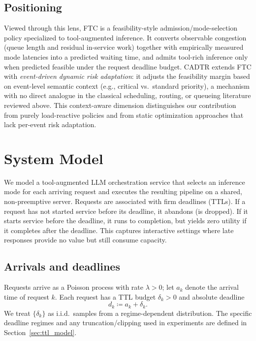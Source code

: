 \documentclass[preprint,12pt]{elsarticle}
\begin{document}
\subsection{Positioning}
Viewed through this lens, FTC is a feasibility-style admission/mode-selection policy specialized to tool-augmented inference. It converts observable congestion (queue length and residual in-service work) together with empirically measured mode latencies into a predicted waiting time, and admits tool-rich inference only when predicted feasible under the request deadline budget. CADTR extends FTC with \emph{event-driven dynamic risk adaptation}: it adjusts the feasibility margin based on event-level semantic context (e.g., critical vs.\ standard priority), a mechanism with no direct analogue in the classical scheduling, routing, or queueing literature reviewed above. This context-aware dimension distinguishes our contribution from purely load-reactive policies and from static optimization approaches that lack per-event risk adaptation.

\section{System Model}
\label{sec:model}

We model a tool-augmented LLM orchestration service that selects an inference mode for each arriving request and executes the resulting pipeline on a shared, non-preemptive server. Requests are associated with firm deadlines (TTLs). If a request has not started service before its deadline, it abandons (is dropped). If it starts service before the deadline, it runs to completion, but yields zero utility if it completes after the deadline. This captures interactive settings where late responses provide no value but still consume capacity.

\subsection{Arrivals and deadlines}
\label{sec:arrivals_deadlines}

Requests arrive as a Poisson process with rate $\lambda>0$; let $a_k$ denote the arrival time of request $k$. Each request has a TTL budget $\delta_k>0$ and absolute deadline
\begin{equation}
d_k \coloneqq a_k + \delta_k.
\end{equation}
We treat $\{\delta_k\}$ as i.i.d.\ samples from a regime-dependent distribution. The specific deadline regimes and any truncation/clipping used in experiments are defined in Section~\ref{sec:ttl_model}.
\end{document}
